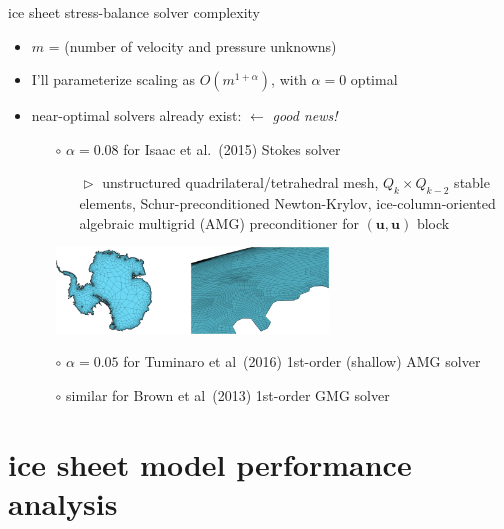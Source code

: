 \documentclass[svgnames,
               hyperref={colorlinks,citecolor=DeepPink4,linkcolor=FireBrick,urlcolor=Maroon},
               usepdftitle=false]  %
               {beamer}
\newcommand{\bu}{\mathbf{u}}
\begin{document}
\begin{frame}{ice sheet stress-balance solver complexity}

\begin{itemize}
\item $m$ = (number of velocity and pressure unknowns)
\item I'll parameterize scaling as $O(m^{1+\alpha})$, with $\alpha=0$ optimal
\item \alert{near-optimal solvers} already exist: \hfill $\leftarrow$ \emph{good news!}
    \begin{itemize}
    \item[$\circ$] $\alpha=0.08$ for Isaac et al.~(2015) Stokes solver
        \begin{itemize}
        \item[$\vartriangleright$] unstructured quadrilateral/tetrahedral mesh, $Q_k\times Q_{k-2}$ stable elements, Schur-preconditioned Newton-Krylov, ice-column-oriented algebraic multigrid (AMG) preconditioner for $(\bu,\bu)$ block
        \end{itemize}

\begin{center}
\includegraphics[width=0.6\textwidth]{images/isaac-antarctica.png}
\end{center}
    \item[$\circ$] $\alpha=0.05$ for Tuminaro et al~(2016) 1st-order (shallow) AMG solver
    \item[$\circ$] similar for Brown et al~(2013) 1st-order GMG solver
    \end{itemize}
\end{itemize}
\end{frame}



\section{ice sheet model performance analysis}
\end{document}

